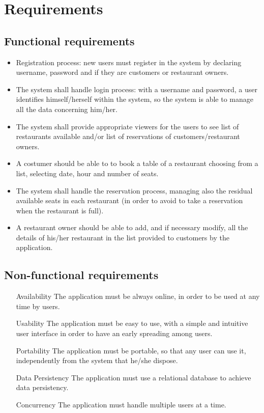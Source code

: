 \section{Requirements}

\subsection{Functional requirements}

\begin{itemize}
	\item Registration process: new users must register in the system by
		declaring username, password and if they are customers or
		restaurant owners.
	\item The system shall handle login process: with a username and
		password, a user identifies himself/herself within the system,
		so the system is able to manage all the data concerning him/her.
	\item The system shall provide appropriate viewers for the users to see
		list of restaurants available and/or list of reservations of
		customers/restaurant owners.
	\item A costumer should be able to to book a table of a restaurant
		choosing from a list, selecting date, hour and number of seats.
	\item The system shall handle the reservation process, managing also the
		residual available seats in each restaurant (in order to avoid
		to take a reservation when the restaurant is full).
	\item A restaurant owner should be able to add, and if necessary modify,
		all the details of his/her restaurant in the list provided to
		customers by the application.
\end{itemize}

\subsection{Non-functional requirements}

\begin{itemize}
	\item[Availability] The application must be always online, in order to
		be used at any time by users.
	\item[Usability] The application must be easy to use, with a simple and
		intuitive user interface in order to have an early spreading
		among users.
	\item[Portability] The application must be portable, so that any user
		can use it, independently from the system that he/she dispose.
	\item[Data Persistency] The application must use a relational database
		to achieve data persistency.
	\item[Concurrency] The application must handle multiple users at a time.
\end{itemize}
